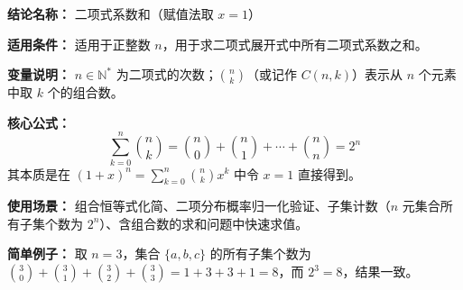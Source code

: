 \textbf{结论名称：} 二项式系数和（赋值法取 \(x=1\)）

\textbf{适用条件：} 适用于正整数 \(n\)，用于求二项式展开式中所有二项式系数之和。

\textbf{变量说明：} \(n \in \mathbb{N}^*\) 为二项式的次数；\(\binom{n}{k}\)（或记作 \(C(n,k)\)）表示从 \(n\) 个元素中取 \(k\) 个的组合数。

\textbf{核心公式：}
\[
\boxed{\sum_{k=0}^{n} \binom{n}{k} = \binom{n}{0} + \binom{n}{1} + \cdots + \binom{n}{n} = 2^n}
\]
其本质是在 \((1+x)^n = \sum_{k=0}^{n} \binom{n}{k} x^k\) 中令 \(x=1\) 直接得到。

\textbf{使用场景：} 组合恒等式化简、二项分布概率归一化验证、子集计数（\(n\) 元集合所有子集个数为 \(2^n\)）、含组合数的求和问题中快速求值。

\textbf{简单例子：} 取 \(n=3\)，集合 \(\{a,b,c\}\) 的所有子集个数为 \(\binom{3}{0}+\binom{3}{1}+\binom{3}{2}+\binom{3}{3}=1+3+3+1=8\)，而 \(2^3=8\)，结果一致。